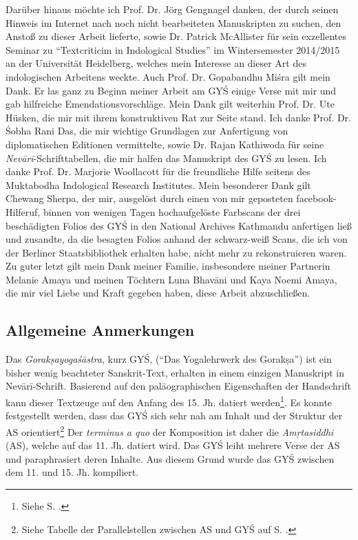 \documentclass[a4paper,12pt]{article}
\begin{document}
Darüber hinaus möchte ich Prof. Dr. Jörg Gengnagel danken, der durch seinen Hinweis im Internet nach noch nicht bearbeiteten Manuskripten zu suchen, den Anstoß zu dieser Arbeit lieferte, sowie Dr. Patrick McAllister für sein exzellentes Seminar zu ``Textcriticim in Indological Studies'' im Wintersemester 2014/2015 an der Universität Heidelberg, welches mein Interesse an dieser Art des indologischen Arbeitens weckte. Auch Prof. Dr. Gopabandhu Miśra gilt mein Dank. Er las ganz zu Beginn meiner Arbeit am GYŚ einige Verse mit mir und gab hilfreiche Emendationsvorschläge. Mein Dank gilt weiterhin Prof. Dr. Ute Hüsken, die mir mit ihrem konstruktiven Rat zur Seite stand. Ich danke Prof. Dr. Śobha Rani Das, die mir wichtige Grundlagen zur Anfertigung von diplomatischen Editionen vermittelte, sowie Dr. Rajan Kathiwoda für seine \textit{Nevārī}-Schrifttabellen, die mir halfen das Manuskript des GYŚ zu lesen. Ich danke Prof. Dr. Marjorie Woollacott für die freundliche Hilfe seitens des Muktabodha Indological Research Institutes. Mein besonderer Dank gilt Chewang Sherpa, der mir, ausgelöst durch einen von mir geposteten facebook-Hilferuf, binnen von wenigen Tagen hochaufgelöste Farbscans der drei beschädigten Folios des GYŚ in den National Archives Kathmandu anfertigen ließ und zusandte, da die besagten Folios anhand der schwarz-weiß Scans, die ich von der Berliner Staatsbibliothek erhalten habe, nicht mehr zu rekonstruieren waren. Zu guter letzt gilt mein Dank meiner Familie, insbesondere meiner Partnerin Melanie Amaya und meinen Töchtern Luna Bhavāni und Kaya Noemi Amaya, die mir viel Liebe und Kraft gegeben haben, diese Arbeit abzuschließen. 

\clearpage

\subsection{Allgemeine Anmerkungen}

Das \textit{Gorakṣayogaśāstra}, kurz GYŚ, (``Das Yogalehrwerk des Gorakṣa'') ist ein bisher wenig beachteter Sanskrit-Text, erhalten in einem einzigen Manuskript in Nevārī-Schrift. Basierend auf den paläographischen Eigenschaften der Handschrift kann dieser Textzeuge auf den Anfang des 15. Jh. datiert werden\footnote{Siehe S. \pageref{datierung}.}. Es konnte festgestellt werden, dass das GYŚ sich sehr nah am Inhalt und der Struktur der AS orientiert\footnote{Siehe Tabelle der Parallelstellen zwischen AS und GYŚ auf S. \pageref{tabelle}.} Der \textit{terminus a quo} der Komposition ist daher die \textit{Amṛtasiddhi} (AS), welche auf das 11. Jh. datiert wird. Das GYŚ leiht mehrere Verse der AS und paraphrasiert deren Inhalte. Aus diesem Grund wurde das GYŚ zwischen dem 11. und 15. Jh. kompiliert.
\end{document}
